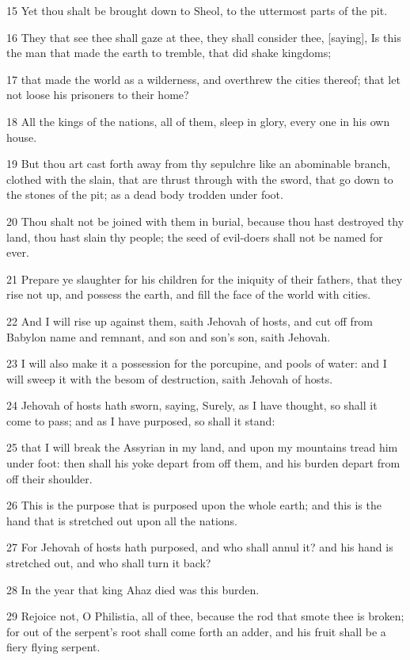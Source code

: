 \par 15 Yet thou shalt be brought down to Sheol, to the uttermost parts of the pit.
\par 16 They that see thee shall gaze at thee, they shall consider thee, [saying], Is this the man that made the earth to tremble, that did shake kingdoms;
\par 17 that made the world as a wilderness, and overthrew the cities thereof; that let not loose his prisoners to their home?
\par 18 All the kings of the nations, all of them, sleep in glory, every one in his own house.
\par 19 But thou art cast forth away from thy sepulchre like an abominable branch, clothed with the slain, that are thrust through with the sword, that go down to the stones of the pit; as a dead body trodden under foot.
\par 20 Thou shalt not be joined with them in burial, because thou hast destroyed thy land, thou hast slain thy people; the seed of evil-doers shall not be named for ever.
\par 21 Prepare ye slaughter for his children for the iniquity of their fathers, that they rise not up, and possess the earth, and fill the face of the world with cities.
\par 22 And I will rise up against them, saith Jehovah of hosts, and cut off from Babylon name and remnant, and son and son's son, saith Jehovah.
\par 23 I will also make it a possession for the porcupine, and pools of water: and I will sweep it with the besom of destruction, saith Jehovah of hosts.
\par 24 Jehovah of hosts hath sworn, saying, Surely, as I have thought, so shall it come to pass; and as I have purposed, so shall it stand:
\par 25 that I will break the Assyrian in my land, and upon my mountains tread him under foot: then shall his yoke depart from off them, and his burden depart from off their shoulder.
\par 26 This is the purpose that is purposed upon the whole earth; and this is the hand that is stretched out upon all the nations.
\par 27 For Jehovah of hosts hath purposed, and who shall annul it? and his hand is stretched out, and who shall turn it back?
\par 28 In the year that king Ahaz died was this burden.
\par 29 Rejoice not, O Philistia, all of thee, because the rod that smote thee is broken; for out of the serpent's root shall come forth an adder, and his fruit shall be a fiery flying serpent.

